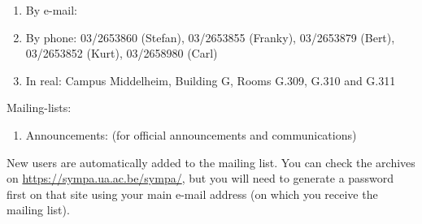 \begin{enumerate}
\item  By e-mail:  \hpcinfo
\item  By phone: 03/2653860 (Stefan), 03/2653855 (Franky), 03/2653879 (Bert), 03/2653852 (Kurt), 03/2658980 (Carl)
\item  In real: Campus Middelheim, Building G, Rooms G.309, G.310 and G.311
\end{enumerate}

Mailing-lists:

\begin{enumerate}
\item  Announcements: \hpcannounceml (for official announcements and communications)
\end{enumerate}

New users are automatically added to the mailing list.
You can check the archives on \url{https://sympa.ua.ac.be/sympa/}, but you will need to
generate a password first on that site using your main e-mail address (on which you
receive the mailing list).
